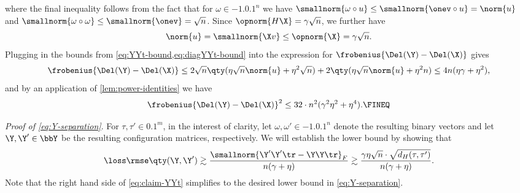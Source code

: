 \documentclass[10pt]{article}
\begin{document}
where the final inequality follows from the fact that for $\omega \in \qty{-1, 0, 1}^n$ we have $\smallnorm{\omega \circ u} \le \smallnorm{\onev \circ u} = \norm{u}$ and $\smallnorm{\omega \circ \omega} \le \smallnorm{\onev} = \sqrt{n}$. Since $\opnorm{H\X} = \gamma\sqrt{n}$, we further have
\begin{align}
    \norm{u} = \smallnorm{\X v} \le \opnorm{\X} = \gamma\sqrt{n}.
\end{align}
Plugging in the bounds from \cref{eq:YYt-bound,eq:diagYYt-bound} into the expression for $\frobenius{\Del(\Y) - \Del(\X)}$ gives
\begin{align}
    \frobenius{\Del(\Y) - \Del(\X)} \le 2\sqrt{n}\qty( \eta \sqrt{n}\norm{u} + \eta^2 \sqrt{n} ) + 2\qty(\eta\sqrt{n}\norm{u} + \eta^2n)\le 4n( \eta\gamma + \eta^2 ),
\end{align}
and by an application of \cref{lem:power-identities} we have
\begin{align}
    \frobenius{\Del(\Y) - \Del(\X)}^2 \le 32 \cdot n^2( \gamma^2\eta^2 + \eta^4 ).\FINEQ
\end{align}

\noindent\textit{Proof of \ref{eq:Y-separation}}.\quad
For $\tau, \tau' \in \qty{0, 1}^m$, in the interest of clarity, let $\omega, \omega' \in \qty{-1, 0, 1}^n$ denote the resulting binary vectors and let $\Y, \Y' \in \bbY$  be the resulting configuration matrices, respectively. We will establish the lower bound by showing that
\begin{align}
    \loss\rmse\qty(\Y, \Y') 
    \gtrsim \frac{\smallnorm{\Y'\Y'{}\tr - \Y\Y\tr}_F}{{n}(\gamma + \eta)}
    \gtrsim \frac{\gamma\eta\sqrt{n} \cdot \sqrt{d_H(\tau, \tau')}}{{n}(\gamma + \eta)}.\label{eq:claim-YYt}
\end{align}
Note that the right hand side of \cref{eq:claim-YYt} simplifies to the desired lower bound in \ref{eq:Y-separation}.
\end{document}
